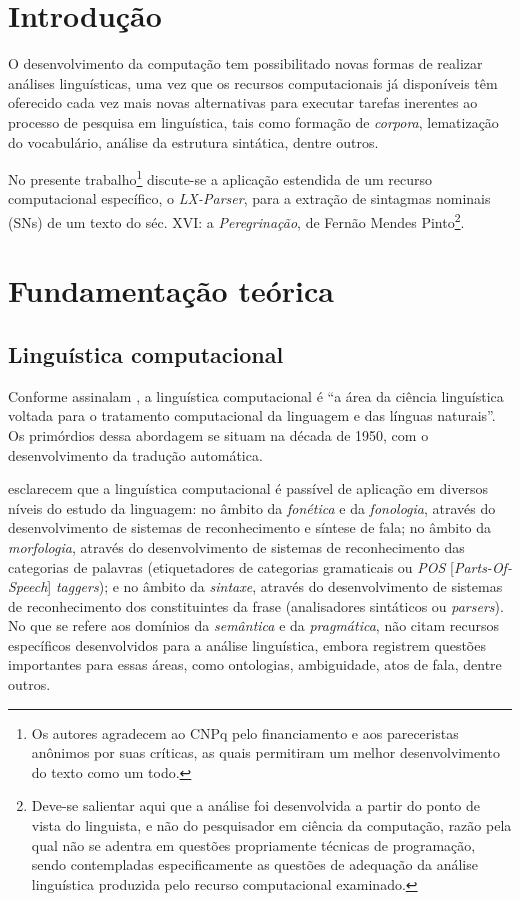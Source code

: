 \documentclass[portuguese]{textolivre}
\begin{document}
\section{Introdução}\label{sec-intro}

O desenvolvimento da computação tem possibilitado novas formas de realizar análises linguísticas, uma vez que os recursos computacionais já disponíveis têm oferecido cada vez mais novas alternativas para executar tarefas inerentes ao processo de pesquisa em linguística, tais como formação de \textit{corpora}, lematização do vocabulário, análise da estrutura sintática, dentre outros.

No presente trabalho\footnote{Os autores agradecem ao CNPq pelo financiamento e aos pareceristas anônimos por suas críticas, as quais permitiram um melhor desenvolvimento do texto como um todo.} discute-se a aplicação estendida de um recurso computacional específico, o \textit{LX-Parser}, para a extração de sintagmas nominais (SNs) de um texto do séc. XVI: a \textit{Peregrinação}, de Fernão Mendes Pinto\footnote{Deve-se salientar aqui que a análise foi desenvolvida a partir do ponto de vista do linguista, e não do pesquisador em ciência da computação, razão pela qual não se adentra em questões propriamente técnicas de programação, sendo contempladas especificamente as questões de adequação da análise linguística produzida pelo recurso computacional examinado.}.

\section{Fundamentação teórica}

\subsection{Linguística computacional}

Conforme assinalam \textcite[p.~25]{othero_linguistica_2005}, a linguística computacional é “a área da ciência linguística voltada para o tratamento computacional da linguagem e das línguas naturais”. Os primórdios dessa abordagem se situam na década de 1950, com o desenvolvimento da tradução automática.

\textcite{vieira_linguistica_2001} esclarecem que a linguística computacional é passível de aplicação em diversos níveis do estudo da linguagem: no âmbito da \textit{fonética} e da \textit{fonologia}, através do desenvolvimento de sistemas de reconhecimento e síntese de fala; no âmbito da \textit{morfologia}, através do desenvolvimento de sistemas de reconhecimento das categorias de palavras (etiquetadores de categorias gramaticais ou \textit{POS} [\textit{Parts-Of-Speech}] \textit{taggers}); e no âmbito da \textit{sintaxe}, através do desenvolvimento de sistemas de reconhecimento dos constituintes da frase (analisadores sintáticos ou \textit{parsers}). No que se refere aos domínios da \textit{semântica} e da \textit{pragmática}, \textcite{vieira_linguistica_2001} não citam recursos específicos desenvolvidos para a análise linguística, embora registrem questões importantes para essas áreas, como ontologias, ambiguidade, atos de fala, dentre outros.
\end{document}
